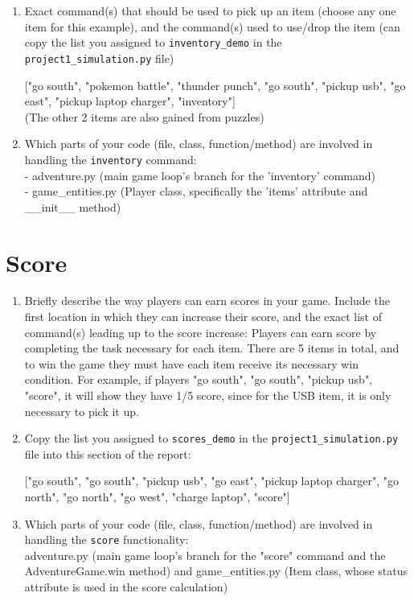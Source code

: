 \documentclass[11pt]{article}
\begin{document}
\begin{enumerate}
    \item Exact command(s) that should be used to pick up an item (choose any one item for this example), and the command(s) used to use/drop the item (can copy the list you assigned to \texttt{inventory\_demo} in the \texttt{project1\_simulation.py} file)

["go south", "pokemon battle", "thunder punch", "go south", "pickup usb", "go east",
                      "pickup laptop charger", "inventory"] \\
(The other 2 items are also gained from puzzles)
    \item Which parts of your code (file, class, function/method) are involved in handling the 
    \texttt{inventory} command: \\
    - adventure.py (main game loop’s branch for the 'inventory' command)
\\- game\_entities.py (Player class, specifically the 'items' attribute and \_\_init\_\_ method)
\end{enumerate}

\section*{Score}
\begin{enumerate}

    \item Briefly describe the way players can earn scores in your game. Include the first location in which they can increase their score, and the exact list of command(s) leading up to the score increase:
Players can earn score by completing the task necessary for each item. There are 5 items in total, and to win the game they must have each item receive its necessary win condition. For example, if players "go south", "go south", "pickup usb", "score", it will show they have 1/5 score, since for the USB item, it is only necessary to pick it up.


    \item Copy the list you assigned to \texttt{scores\_demo} in the \texttt{project1\_simulation.py} file into this section of the report:

["go south", "go south", "pickup usb", "go east",
                   "pickup laptop charger", "go north", "go north", "go west", "charge laptop", "score"]


    \item Which parts of your code (file, class, function/method) are involved in handling the \texttt{score} functionality: \\
    adventure.py (main game loop’s branch for the "score" command and the AdventureGame.win method) and game\_entities.py (Item class, whose status attribute is used in the score calculation)
\end{enumerate}
\end{document}
